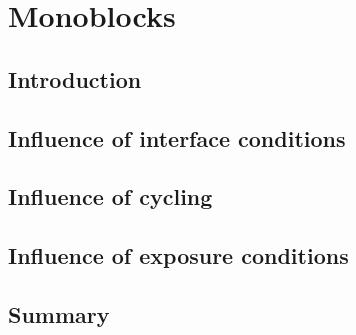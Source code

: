 \setchapterpreamble[u]{\margintoc}
\chapter{Monoblocks}
\section{Introduction}
\section{Influence of interface conditions}

\section{Influence of cycling}
\section{Influence of exposure conditions}

\section{Summary}
